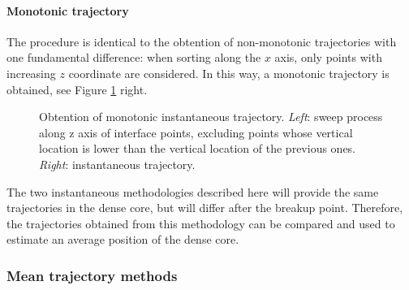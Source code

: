 \clearpage

\paragraph*{Monotonic trajectory} 

The procedure is identical to the obtention of non-monotonic trajectories with one fundamental difference: when sorting along the $x$ axis, only points with increasing $z$ coordinate are considered. In this way, a monotonic trajectory is obtained, see Figure \ref{fig:trajectory_obtention_instantaneous_method_b} right. 


\begin{figure}[ht]
     \centering
     \begin{subfigure}[b]{0.45\textwidth}
         \centering
     \end{subfigure}
     \begin{subfigure}[b]{0.45\textwidth}
         \centering
     \end{subfigure}
        \caption[Obtention of monotonic instantaneous trajectory]{Obtention of monotonic instantaneous trajectory. \textsl{Left}: sweep process along z axis of interface points, excluding points whose vertical location is lower than the vertical location of the previous ones. \textsl{Right}: instantaneous trajectory.}
        \label{fig:trajectory_obtention_instantaneous_method_b}
\end{figure}

The two instantaneous methodologies described here will provide the same trajectories in the dense core, but will differ after the breakup point. Therefore, the trajectories obtained from this methodology can be compared and used to estimate an average position of the dense core. 


\subsubsection{Mean trajectory methods}

